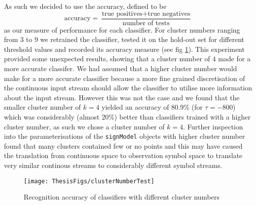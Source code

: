 As such we decided to use the accuracy, defined to be 
\begin{equation*}
\text{accuracy} = \frac{\text{true positives}+\text{true negatives}}{\text{number of tests}}
\end{equation*}
as our measure of performance for each classifier. For cluster numbers ranging from $3$ to $9$ we retrained the classifier, tested it on the hold-out set for different threshold values and recorded its accuracy measure (see fig \ref{fig:clustTest}). This experiment provided some unexpected results, showing that a cluster number of $4$ made for a more accurate classifer. We had assumed that a higher cluster number would make for a more accurate classifier because a more fine grained discretisation of the continuous input stream should allow the classifier to utilise more information about the input stream. However this was not the case and we found that the smaller cluster number of $k=4$ yielded an accuracy of 80.9\% (for $\tau = -800$) which was considerably (almost 20\%) better than classifiers trained with a higher cluster number, as such we chose a cluster number of $k=4$. Further inspection into the parameterisations of the \verb|signModel| objects with higher cluster number found that many clusters contained few or no points and this may have caused the translation from continuous space to observation symbol space to translate very similar continous streams to considerably different symbol streams.

\begin{figure}[h!]
        \centering
        \texttt{[image: ThesisFigs/clusterNumberTest]}
        \caption{Recognition accuracy of classifiers with different cluster numbers}\label{fig:clustTest}
\end{figure}


